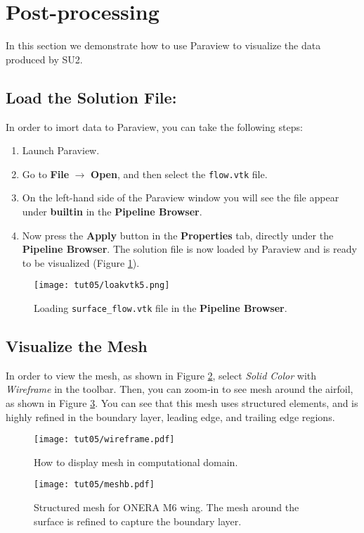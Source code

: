 \section{Post-processing}
In this section we demonstrate how to use Paraview to visualize the data produced by SU2.
\subsection{Load the Solution File:}
In order to imort data to Paraview, you can take the following steps:
\begin{enumerate}[label=\arabic*)]
	\setcounter{enumi}{0}
	\item Launch Paraview.
	\item Go to \textbf{File} $\rightarrow$ \textbf{Open}, and then select the \texttt{flow.vtk} file.
	\item On the left-hand side of the Paraview window you will see the file appear under \textbf{builtin} in the \textbf{Pipeline Browser}.
	\item Now press the \textbf{Apply} button in the \textbf{Properties} tab, directly under the \textbf{Pipeline Browser}. The solution file is now loaded by Paraview and is ready to be visualized (Figure \ref{fig5:load}).
\end{enumerate}
\begin{figure}[ht]
    \centering
    \texttt{[image: tut05/loakvtk5.png]}
    \caption{Loading \texttt{surface\_flow.vtk} file in the \textbf{Pipeline Browser}.}
    \label{fig5:load}
\end{figure}
\subsection{Visualize the Mesh}
In order to view the mesh, as shown in Figure \ref{fig5:wireframe}, select \textit{Solid Color} with \textit{Wireframe} in the toolbar. Then, you can zoom-in to see mesh around the airfoil, as shown in Figure \ref{fig5:mesh}. You can see that this mesh uses structured elements, and is highly refined in the boundary layer, leading edge, and trailing edge regions.
\begin{figure}[ht]
    \centering
    \texttt{[image: tut05/wireframe.pdf]}
    \caption{How to display mesh in computational domain.}
    \label{fig5:wireframe}
\end{figure}
\begin{figure}[ht]
    \centering
    \texttt{[image: tut05/meshb.pdf]}
    \caption{Structured mesh for ONERA M6 wing. The mesh around the surface is refined to capture the boundary layer.}
    \label{fig5:mesh}
\end{figure}
